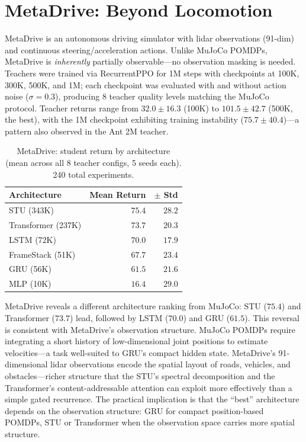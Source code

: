 \section{MetaDrive: Beyond Locomotion}
\label{sec:metadrive}

MetaDrive is an autonomous driving simulator with lidar observations (91-dim) and continuous steering/acceleration actions.
Unlike MuJoCo POMDPs, MetaDrive is \emph{inherently} partially observable---no observation masking is needed.
Teachers were trained via RecurrentPPO for 1M steps with checkpoints at 100K, 300K, 500K, and 1M; each checkpoint was evaluated with and without action noise ($\sigma{=}0.3$), producing 8 teacher quality levels matching the MuJoCo protocol.
Teacher returns range from $32.0 \pm 16.3$ (100K) to $101.5 \pm 42.7$ (500K, the best), with the 1M checkpoint exhibiting training instability ($75.7 \pm 40.4$)---a pattern also observed in the Ant 2M teacher.

\begin{table}[ht]
\centering
\caption{MetaDrive: student return by architecture (mean across all 8 teacher configs, 5 seeds each). 240 total experiments.}
\label{tab:metadrive}
\begin{tabular}{lrr}
\toprule
Architecture & Mean Return & $\pm$ Std \\
\midrule
STU (343K)        & $\mathbf{75.4}$ & $28.2$ \\
Transformer (237K) & $73.7$ & $20.3$ \\
LSTM (72K)        & $70.0$ & $17.9$ \\
FrameStack (51K)  & $67.7$ & $23.4$ \\
GRU (56K)         & $61.5$ & $21.6$ \\
MLP (10K)         & $16.4$ & $29.0$ \\
\bottomrule
\end{tabular}
\end{table}

MetaDrive reveals a different architecture ranking from MuJoCo: STU ($75.4$) and Transformer ($73.7$) lead, followed by LSTM ($70.0$) and GRU ($61.5$).
This reversal is consistent with MetaDrive's observation structure.
MuJoCo POMDPs require integrating a short history of low-dimensional joint positions to estimate velocities---a task well-suited to GRU's compact hidden state.
MetaDrive's 91-dimensional lidar observations encode the spatial layout of roads, vehicles, and obstacles---richer structure that the STU's spectral decomposition and the Transformer's content-addressable attention can exploit more effectively than a simple gated recurrence.
The practical implication is that the ``best'' architecture depends on the observation structure: GRU for compact position-based POMDPs, STU or Transformer when the observation space carries more spatial structure.

